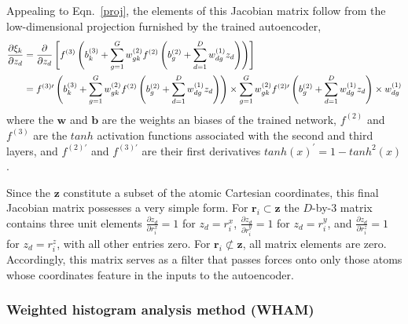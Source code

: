 \documentclass[12pt]{article}
\newcommand*{\blauw}[1]{#1}
\begin{document}
 Appealing to \blauw{Eqn.~\ref{proj}}, the elements of this Jacobian matrix follow from the low-dimensional projection furnished by the trained autoencoder,
\begin{align} \label{dxidz}
\frac{\partial \xi_k}{\partial z_d} &= \frac{\partial}{\partial z_d} \left[ f^{(3)} \left( b_k^{(3)} + \sum_{g=1}^G w_{gk}^{(2)} f^{(2)} \left( b_g^{(2)} + \sum_{d=1}^D w_{dg}^{(1)} z_d \right) \right) \right] \notag \\
&= f^{(3)\prime} \left( b_k^{(3)} + \sum_{g=1}^G w_{gk}^{(2)} f^{(2)} \left( b_g^{(2)} + \sum_{d=1}^D w_{dg}^{(1)} z_d \right) \right) \times \sum_{g=1}^G w_{gk}^{(2)} f^{(2)\prime} \left( b_g^{(2)} + \sum_{d=1}^D w_{dg}^{(1)} z_d \right) \times w_{dg}^{(1)}
\end{align}
where the $\mathbf{w}$ and $\mathbf{b}$ are the weights an biases of the trained network, $f^{(2)}$ and $f^{(3)}$ are the $tanh$ activation functions associated with the second and third layers, and $f^{(2)\prime}$ and $f^{(3)\prime}$ are their first derivatives $tanh(x)^\prime = 1 - tanh^2(x)$. 

 Since the $\mathbf{z}$ constitute a subset of the atomic Cartesian coordinates, this final Jacobian matrix possesses a very simple form. For $\mathbf{r}_i \subset \mathbf{z}$ the $D$-by-3 matrix contains three unit elements $\frac{\partial z_d}{\partial r_i^x} = 1$ for $z_d = r_i^x$, $\frac{\partial z_d}{\partial r_i^y} = 1$ for $z_d = r_i^y$, and $\frac{\partial z_d}{\partial r_i^z} = 1$ for $z_d = r_i^z$, with all other entries zero. For $\mathbf{r}_i \not\subset \mathbf{z}$, all matrix elements are zero. Accordingly, this matrix serves as a filter that passes forces onto only those atoms whose coordinates feature in the inputs to the autoencoder.



\subsubsection{\sffamily \normalsize Weighted histogram analysis method (WHAM)} \label{WHAM}
\end{document}
